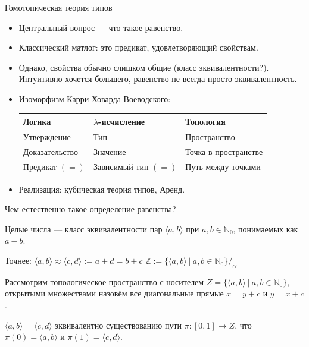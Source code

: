 \documentclass[aspectratio=169]{beamer}
\begin{document}
\begin{frame}[fragile]{Гомотопическая теория типов}
\begin{itemize}
\item Центральный вопрос --- что такое равенство.
\item Классический матлог: это предикат, удовлетворяющий свойствам.
\item Однако, свойства обычно слишком общие (класс эквивалентности?). Интуитивно хочется большего,
равенство не всегда просто эквивалентность.
\item Изоморфизм Карри-Ховарда-Воеводского:
\begin{tabular}{lll}
Логика & $\lambda$-исчисление & Топология\\\hline
Утверждение & Тип & Пространство \\
Доказательство & Значение & Точка в пространстве\\
Предикат $(=)$ & Зависимый тип $(=)$ & Путь между точками
\end{tabular}
\item Реализация: кубическая теория типов, Аренд.
\end{itemize}
\end{frame}

\begin{frame}{Чем естественно такое определение равенства?}
\begin{multicols}{2}
Целые числа --- класс эквивалентности пар $\langle a,b\rangle$ при $a,b\in\mathbb{N}_0$, понимаемых как $a-b$.

Точнее:
$\langle a,b\rangle\approx\langle c,d\rangle := a+d = b +c$
$\mathbb{Z} := \{\langle a,b\rangle\ |\ a,b\in\mathbb{N}_0\}/_\approx$


Рассмотрим топологическое пространство с носителем $Z = \{\langle a,b\rangle\ |\ a,b\in\mathbb{N}_0\}$,\\
открытыми множествами назовём все диагональные прямые $x = y + c$ и $y = x + c$.\\

\columnbreak



$\langle a,b \rangle = \langle c,d\rangle$ эквивалентно существованию пути
$\pi : [0,1] \rightarrow Z$, что $\pi(0) = \langle a,b\rangle$ и $\pi(1) = \langle c,d\rangle$.


\end{multicols}
\end{frame}
\end{document}
